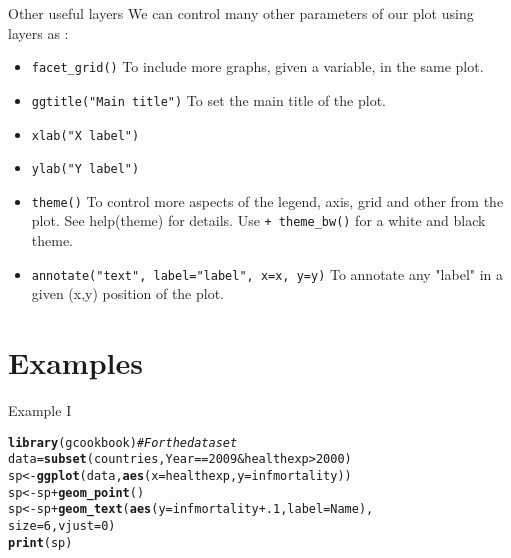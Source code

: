 \documentclass{beamer}\usepackage[]{graphicx}\usepackage[]{color}
\makeatletter
\newcommand{\hlnum}[1]{\textcolor[rgb]{0.686,0.059,0.569}{#1}}%
\newcommand{\hlcom}[1]{\textcolor[rgb]{0.678,0.584,0.686}{\textit{#1}}}%
\newcommand{\hlopt}[1]{\textcolor[rgb]{0,0,0}{#1}}%
\newcommand{\hlstd}[1]{\textcolor[rgb]{0.345,0.345,0.345}{#1}}%
\newcommand{\hlkwb}[1]{\textcolor[rgb]{0.69,0.353,0.396}{#1}}%
\newcommand{\hlkwc}[1]{\textcolor[rgb]{0.333,0.667,0.333}{#1}}%
\newcommand{\hlkwd}[1]{\textcolor[rgb]{0.737,0.353,0.396}{\textbf{#1}}}%
\newenvironment{kframe}{%
 \def\at@end@of@kframe{}%
 \ifinner\ifhmode%
  \def\at@end@of@kframe{\end{minipage}}%
  \begin{minipage}{\columnwidth}%
 \fi\fi%
 \def\FrameCommand##1{\hskip\@totalleftmargin \hskip-\fboxsep
 \colorbox{shadecolor}{##1}\hskip-\fboxsep
     \hskip-\linewidth \hskip-\@totalleftmargin \hskip\columnwidth}%
 \MakeFramed {\advance\hsize-\width
   \@totalleftmargin\z@ \linewidth\hsize
   \@setminipage}}%
 {\par\unskip\endMakeFramed%
 \at@end@of@kframe}
\newenvironment{knitrout}{}{} %
\makeatother
\begin{document}
\begin{frame}[containsverbatim]{Other useful layers}
We can control many other parameters of our plot using layers as : 
\begin{itemize}
\item \texttt{facet\_grid()} To include more graphs, given a variable, in the same plot.
\item \texttt{ggtitle("Main title")} To set the main title of the plot.
\item \texttt{xlab("X label")} 
\item \texttt{ylab("Y label")} 
\item \texttt{theme()} To control more aspects of the legend, axis, grid and other from the plot. See help(theme) for details. Use \texttt{+ theme\_bw()} for a white and black theme.
\item \texttt{annotate("text", label="label", x=x, y=y)} To annotate any "label" in a given (x,y) position of the plot.

\end{itemize}
\end{frame}

\section{Examples}
\begin{frame}[containsverbatim]{Example I}
\begin{knitrout}\footnotesize
{}\color{fgcolor}\begin{kframe}
\begin{alltt}
\hlkwd{library}\hlstd{(gcookbook)} \hlcom{# For the data set}
\hlstd{data}\hlkwb{=} \hlkwd{subset}\hlstd{(countries, Year}\hlopt{==}\hlnum{2009} \hlopt{&} \hlstd{healthexp}\hlopt{>}\hlnum{2000}\hlstd{)}
\hlstd{sp} \hlkwb{<-} \hlkwd{ggplot}\hlstd{(data,} \hlkwd{aes}\hlstd{(}\hlkwc{x}\hlstd{=healthexp,} \hlkwc{y}\hlstd{=infmortality))}
\hlstd{sp} \hlkwb{<-} \hlstd{sp} \hlopt{+} \hlkwd{geom_point}\hlstd{()}
\hlstd{sp} \hlkwb{<-} \hlstd{sp} \hlopt{+} \hlkwd{geom_text}\hlstd{(}\hlkwd{aes}\hlstd{(}\hlkwc{y}\hlstd{=infmortality}\hlopt{+}\hlnum{.1}\hlstd{,} \hlkwc{label}\hlstd{=Name),}
\hlkwc{size}\hlstd{=}\hlnum{6}\hlstd{,} \hlkwc{vjust}\hlstd{=}\hlnum{0}\hlstd{)}
\hlkwd{print}\hlstd{(sp)}
\end{alltt}
\end{kframe}
\end{knitrout}
\end{frame}
\end{document}
